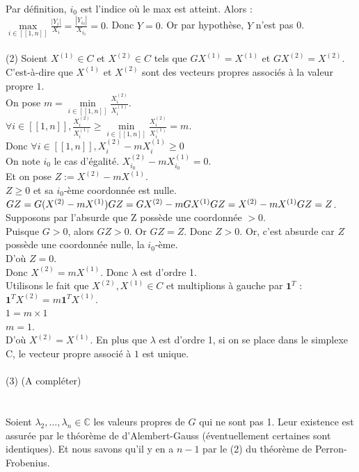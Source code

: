 \documentclass{article}
\begin{document}
\\Par définition, $i_0$ est l'indice où le max est atteint. Alors :
\\$\max\limits_{i \in[\![1,n]\!]}\frac{|Y_i|}{X_i}=\frac{|Y_{i_0}|}{X_{i_0}}=0$. Donc $Y=0$. Or par hypothèse, $Y$ n'est pas 0.
\\\\(2) Soient $X^{(1)}\in C$ et $X^{(2)}\in C$ tels que $GX^{(1)}=X^{(1)}$ et $GX^{(2)}=X^{(2)}$.
\\C'est-à-dire que $X^{(1)}$ et $X^{(2)}$ sont des vecteurs propres associés à la valeur propre $1$.
\\On pose $m=\min\limits_{i \in[\![1,n]\!]}\frac{X_i^{(2)}}{X_i^{(1)}}$.
\\$\forall i\in[\![1,n]\!],\frac{X_i^{(2)}}{X_i^{(1)}}\geq\min\limits_{i \in[\![1,n]\!]}\frac{X_i^{(2)}}{X_i^{(1)}}=m$.
\\Donc $\forall i\in[\![1,n]\!],X_i^{(2)}-mX_i^{(1)}\geq0$
\\On note $i_0$ le cas d'égalité. $X_{i_0}^{(2)}-mX_{i_0}^{(1)}=0$.
\\Et on pose $Z:=X^{(2)}-mX^{(1)}$.
\\$Z\geq0$ et sa $i_0$-ème coordonnée est nulle.
\\$GZ=G(X^{(2)}-mX^{(1)})\\GZ=GX^{(2)}-mGX^{(1)}\\GZ=X^{(2)}-mX^{(1)}\\GZ=Z$.
\\Supposons par l'absurde que Z possède une coordonnée $>0$.
\\Puisque $G>0$, alors $GZ>0$. Or $GZ=Z$. Donc $Z>0$. Or, c'est absurde car $Z$ possède une coordonnée nulle, la $i_0$-ème.
\\D'où $Z=0$.
\\Donc $X^{(2)}=mX^{(1)}$. Donc $\lambda$ est d'ordre 1.
\\Utilisons le fait que $X^{(2)},X^{(1)}\in C$ et multiplions à gauche par $\textbf{1}^T$ :
\\$\textbf{1}^TX^{(2)}=m\textbf{1}^TX^{(1)}$.
\\$1=m\times1$
\\$m=1$.
\\D'où $X^{(2)}=X^{(1)}.$ En plus que $\lambda$ est d'ordre 1, si on se place dans le simplexe C, le vecteur propre associé à $1$ est unique.
\\\\(3) (A compléter)
\\
\\\\Soient $\lambda_2,\dots,\lambda_n\in\mathbb{C}$ les valeurs propres de $G$ qui ne sont pas 1. Leur existence est assurée par le théorème de d'Alembert-Gauss (éventuellement certaines sont identiques). Et nous savons qu'il y en a $n-1$ par le (2) du théorème de Perron-Frobenius.
\end{document}

